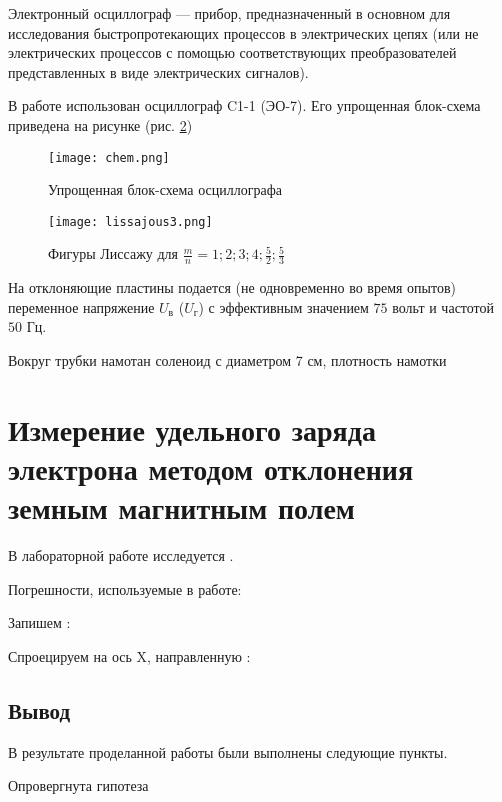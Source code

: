 Электронный осциллограф — прибор, предназначенный в основном для исследования быстропротекающих процессов в электрических цепях (или не электрических процессов с помощью соответствующих преобразователей представленных в виде электрических сигналов).

В работе использован осциллограф C1-1 (ЭО-7). Его упрощенная блок-схема приведена на рисунке (рис. \ref{fig:cxem})

\begin{figure}[ht!]
	\centering
	\texttt{[image: chem.png]}
	\caption{Упрощенная блок-схема осциллографа}
	\label{fig:chem}
\end{figure}

\begin{figure}[ht!]
	\centering
	\texttt{[image: lissajous3.png]}
	\caption{Фигуры Лиссажу для $\frac{m}{n}=1;2;3;4;\frac{5}{2};\frac{5}{3}$}
	\label{fig:cxem}
\end{figure}



На отклоняющие пластины подается (не одновременно во время опытов) переменное напряжение $U_\text{в}$ ($U_\text{г}$) с эффективным значением $75$ вольт и частотой $50$ Гц. 

Вокруг трубки намотан соленоид с диаметром 7 см, плотность намотки 



\section{Измерение удельного заряда электрона методом отклонения земным магнитным полем}

В лабораторной работе исследуется .

Погрешности, используемые в работе: 

Запишем :
\begin{EqSystem}
\end{EqSystem}

Спроецируем на ось X, направленную :
\begin{EqSystem}
	\label{eq:}
\end{EqSystem}

\subsection{Вывод}

В результате проделанной работы были выполнены следующие пункты.

Опровергнута гипотеза 

